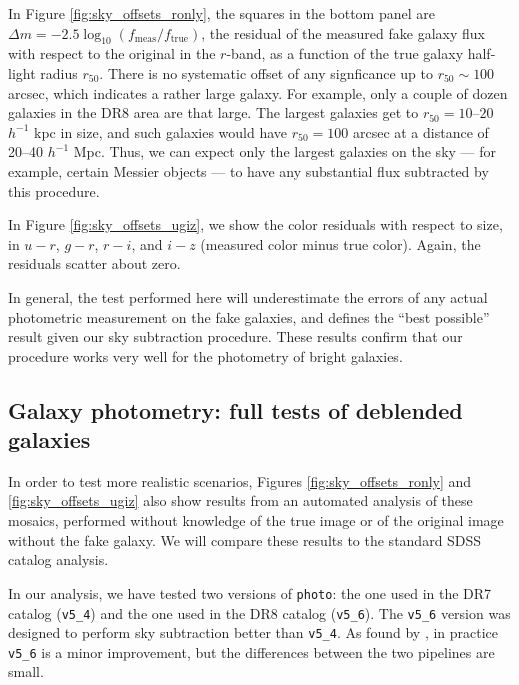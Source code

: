 \documentclass[10pt,preprint]{aastex}
\begin{document}
In Figure \ref{fig:sky_offsets_ronly}, the squares in the bottom panel
are $\Delta m = -2.5\log_{10}(f_{\mathrm{meas}}/f_{\mathrm{true}})$,
the residual of the measured fake galaxy flux with respect to the
original in the $r$-band, as a function of the true galaxy half-light
radius $r_{50}$.  There is no systematic offset of any signficance up
to $r_{50} \sim 100$ arcsec, which indicates a rather large galaxy.
For example, only a couple of dozen galaxies in the DR8 area are that
large. The largest galaxies get to $r_{50}= 10$--$20$ $h^{-1}$ kpc in
size, and such galaxies would have $r_{50} = 100$ arcsec at a distance
of 20--40 $h^{-1}$ Mpc. Thus, we can expect only the largest galaxies
on the sky --- for example, certain Messier objects --- to have any
substantial flux subtracted by this procedure.

In Figure \ref{fig:sky_offsets_ugiz}, we show the color residuals with
respect to size, in $u-r$, $g-r$, $r-i$, and $i-z$ (measured color
minus true color). Again, the residuals scatter about zero.

In general, the test performed here will underestimate the errors of
any actual photometric measurement on the fake galaxies, and defines
the ``best possible'' result given our sky subtraction
procedure. These results confirm that our procedure works very well
for the photometry of bright galaxies.

\subsection{Galaxy photometry: full tests of deblended galaxies}
\label{sec:deblendgal}

In order to test more realistic scenarios, Figures
\ref{fig:sky_offsets_ronly} and \ref{fig:sky_offsets_ugiz} also show
results from an automated analysis of these mosaics, performed without
knowledge of the true image or of the original image without the fake
galaxy. We will compare these results to the standard SDSS catalog
analysis.

In our analysis, we have tested two versions of {\tt photo}: the one
used in the DR7 catalog ({\tt v5\_4}) and the one used in the DR8
catalog ({\tt v5\_6}). The {\tt v5\_6} version was designed to perform
sky subtraction better than {\tt v5\_4}.  As found by
\citet{aihara11a}, in practice {\tt v5\_6} is a minor improvement, but
the differences between the two pipelines are small.
\end{document}
